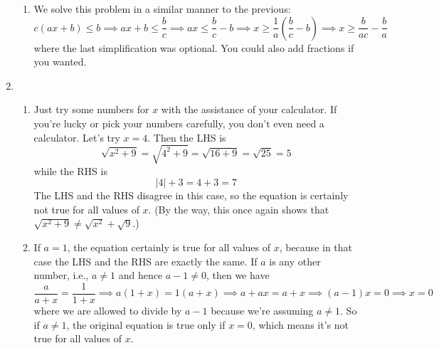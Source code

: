 \documentclass{article}
\newcommand{\ds}{\displaystyle}
\begin{document}
\begin{enumerate}
\begin{enumerate}
  \item %
    We solve this problem in a similar manner to the previous:
    \begin{equation*}
      c(ax+b) \le b \implies ax+b \le \frac{b}{c}
      \implies ax \le \frac{b}{c} - b
      \implies x \ge \frac{1}{a} \left(\frac{b}{c} - b\right)
      \implies x \ge \frac{b}{ac} - \frac{b}{a}
    \end{equation*}
    where the last simplification was optional.  You could also add
    fractions if you wanted.
  \end{enumerate}
\item %
  \begin{enumerate}
  \item %
    Just try some numbers for $x$ with the assistance of your
    calculator.  If you're lucky or pick your numbers carefully, you
    don't even need a calculator.  Let's try $x=4$.  Then the LHS is
    \begin{equation*}
      \sqrt{x^2+9} = \sqrt{4^2+9} = \sqrt{16+9} = \sqrt{25} = 5
    \end{equation*}
    while the RHS is
    \begin{equation*}
      |4|+3 = 4+3 = 7
    \end{equation*}
    The LHS and the RHS disagree in this case, so the equation is
    certainly not true for all values of $x$.  (By the way, this once
    again shows that $\sqrt{x^2+9} \ne \sqrt{x^2} + \sqrt{9}$.)
  \item %
    If $a=1$, the equation certainly is true for all values of
    $x$, because in that case the LHS and the RHS are exactly the
    same.  If $a$ is any other number, i.e., $a\ne
    1$ and hence $a-1\ne 0$, then we have
    \begin{equation*}
      \frac{a}{a+x} = \frac{1}{1+x}
      \implies a(1+x) = 1(a+x) \implies a + ax = a + x
      \implies (a-1)x = 0 
      \implies x = 0
    \end{equation*}
    where we are allowed to divide by $a-1$ because we're assuming
    $a\ne 1$.  So if $a\ne 1$, the original equation is true only if
    $x=0$, which means it's not true for all values of $x$.
  \end{enumerate}
\end{enumerate}
\end{document}

